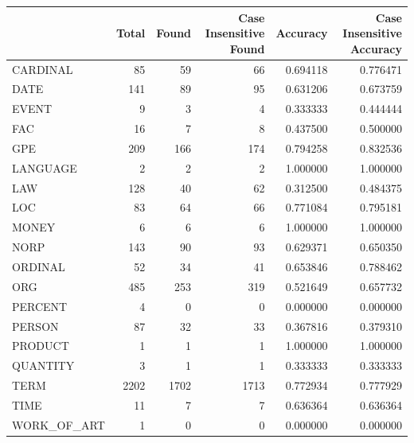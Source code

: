 \begin{tabular}{lrrrrr}
\toprule
 & Total & Found & Case Insensitive Found & Accuracy & Case Insensitive Accuracy \\
\midrule
CARDINAL & 85 & 59 & 66 & 0.694118 & 0.776471 \\
DATE & 141 & 89 & 95 & 0.631206 & 0.673759 \\
EVENT & 9 & 3 & 4 & 0.333333 & 0.444444 \\
FAC & 16 & 7 & 8 & 0.437500 & 0.500000 \\
GPE & 209 & 166 & 174 & 0.794258 & 0.832536 \\
LANGUAGE & 2 & 2 & 2 & 1.000000 & 1.000000 \\
LAW & 128 & 40 & 62 & 0.312500 & 0.484375 \\
LOC & 83 & 64 & 66 & 0.771084 & 0.795181 \\
MONEY & 6 & 6 & 6 & 1.000000 & 1.000000 \\
NORP & 143 & 90 & 93 & 0.629371 & 0.650350 \\
ORDINAL & 52 & 34 & 41 & 0.653846 & 0.788462 \\
ORG & 485 & 253 & 319 & 0.521649 & 0.657732 \\
PERCENT & 4 & 0 & 0 & 0.000000 & 0.000000 \\
PERSON & 87 & 32 & 33 & 0.367816 & 0.379310 \\
PRODUCT & 1 & 1 & 1 & 1.000000 & 1.000000 \\
QUANTITY & 3 & 1 & 1 & 0.333333 & 0.333333 \\
TERM & 2202 & 1702 & 1713 & 0.772934 & 0.777929 \\
TIME & 11 & 7 & 7 & 0.636364 & 0.636364 \\
WORK_OF_ART & 1 & 0 & 0 & 0.000000 & 0.000000 \\
\bottomrule
\end{tabular}
